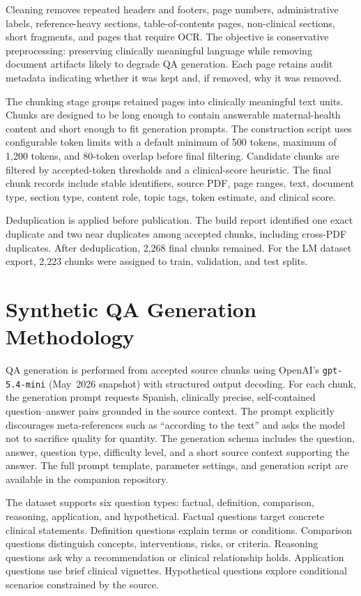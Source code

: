 \documentclass[conference]{IEEEtran}
\begin{document}
Cleaning removes repeated headers and footers, page numbers, administrative labels, reference-heavy sections, table-of-contents pages, non-clinical sections, short fragments, and pages that require OCR. The objective is conservative preprocessing: preserving clinically meaningful language while removing document artifacts likely to degrade QA generation. Each page retains audit metadata indicating whether it was kept and, if removed, why it was removed.

The chunking stage groups retained pages into clinically meaningful text units. Chunks are designed to be long enough to contain answerable maternal-health content and short enough to fit generation prompts. The construction script uses configurable token limits with a default minimum of 500 tokens, maximum of 1,200 tokens, and 80-token overlap before final filtering. Candidate chunks are filtered by accepted-token thresholds and a clinical-score heuristic. The final chunk records include stable identifiers, source PDF, page ranges, text, document type, section type, content role, topic tags, token estimate, and clinical score.

Deduplication is applied before publication. The build report identified one exact duplicate and two near duplicates among accepted chunks, including cross-PDF duplicates. After deduplication, 2,268 final chunks remained. For the LM dataset export, 2,223 chunks were assigned to train, validation, and test splits.

\section{Synthetic QA Generation Methodology}
QA generation is performed from accepted source chunks using OpenAI's \texttt{gpt-5.4-mini} (May~2026 snapshot) with structured output decoding. For each chunk, the generation prompt requests Spanish, clinically precise, self-contained question--answer pairs grounded in the source context. The prompt explicitly discourages meta-references such as ``according to the text'' and asks the model not to sacrifice quality for quantity. The generation schema includes the question, answer, question type, difficulty level, and a short source context supporting the answer. The full prompt template, parameter settings, and generation script are available in the companion repository.

The dataset supports six question types: factual, definition, comparison, reasoning, application, and hypothetical. Factual questions target concrete clinical statements. Definition questions explain terms or conditions. Comparison questions distinguish concepts, interventions, risks, or criteria. Reasoning questions ask why a recommendation or clinical relationship holds. Application questions use brief clinical vignettes. Hypothetical questions explore conditional scenarios constrained by the source.
\end{document}
